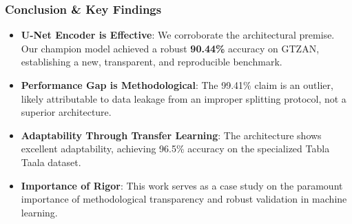 \documentclass{beamer}
\begin{document}
\begin{frame}
    \frametitle{Conclusion \& Key Findings}
    \begin{itemize}
        \item \textbf{U-Net Encoder is Effective}: We corroborate the architectural premise. Our champion model achieved a robust \textbf{90.44\%} accuracy on GTZAN, establishing a new, transparent, and reproducible benchmark.
        \vspace{0.4cm}
        \item \textbf{Performance Gap is Methodological}: The 99.41\% claim is an outlier, likely attributable to data leakage from an improper splitting protocol, not a superior architecture.
        \vspace{0.4cm}
        \item \textbf{Adaptability Through Transfer Learning}: The architecture shows excellent adaptability, achieving 96.5\% accuracy on the specialized Tabla Taala dataset.
        \vspace{0.4cm}
        \item \textbf{Importance of Rigor}: This work serves as a case study on the paramount importance of methodological transparency and robust validation in machine learning.
    \end{itemize}
\end{frame}

\end{document}
